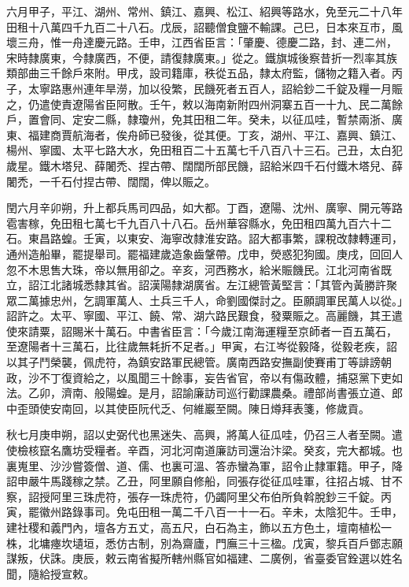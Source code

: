 \begin{pinyinscope}
 六月甲子，平江、湖州、常州、鎮江、嘉興、松江、紹興等路水，免至元二十八年田租十八萬四千九百二十八石。戊辰，詔聽僧食鹽不輸課。己巳，日本來互市，風壞三舟，惟一舟達慶元路。壬申，江西省臣言：「肇慶、德慶二路，封、連二州，宋時隸廣東，今隸廣西，不便，請復隸廣東。」從之。鐵旗城後察昔折一烈率其族類部曲三千餘戶來附。甲戌，設司籍庫，秩從五品，隸太府監，儲物之籍入者。丙子，太寧路惠州連年旱澇，加以役繁，民饑死者五百人，詔給鈔二千錠及糧一月賑之，仍遣使責遼陽省臣阿散。壬午，敕以海南新附四州洞寨五百一十九、民二萬餘戶，置會同、定安二縣，隸瓊州，免其田租二年。癸未，以征瓜哇，暫禁兩浙、廣東、福建商賈航海者，俟舟師已發後，從其便。丁亥，湖州、平江、嘉興、鎮江、楊州、寧國、太平七路大水，免田租百二十五萬七千八百八十三石。己丑，太白犯歲星。鐵木塔兒、薛闍禿、捏古帶、闊闊所部民饑，詔給米四千石付鐵木塔兒、薛闍禿，一千石付捏古帶、闊闊，俾以賑之。



 閏六月辛卯朔，升上都兵馬司四品，如大都。丁酉，遼陽、沈州、廣寧、開元等路雹害稼，免田租七萬七千九百八十八石。岳州華容縣水，免田租四萬九百六十二石。東昌路蝗。壬寅，以東安、海寧改隸淮安路。詔大都事繁，課稅改隸轉運司，通州造船畢，罷提舉司。罷福建歲造象齒鞶帶。戊申，熒惑犯狗國。庚戌，回回人忽不木思售大珠，帝以無用卻之。辛亥，河西務水，給米賑饑民。江北河南省既立，詔江北諸城悉隸其省。詔漢陽隸湖廣省。左江總管黃堅言：「其管內黃勝許聚眾二萬據忠州，乞調軍萬人、土兵三千人，命劉國傑討之。臣願調軍民萬人以從。」詔許之。太平、寧國、平江、饒、常、湖六路民艱食，發粟賑之。高麗饑，其王遣使來請粟，詔賜米十萬石。中書省臣言：「今歲江南海運糧至京師者一百五萬石，至遼陽者十三萬石，比往歲無耗折不足者。」甲寅，右江岑從毅降，從毅老疾，詔以其子鬥榮襲，佩虎符，為鎮安路軍民總管。廣南西路安撫副使賽甫丁等誹謗朝政，沙不丁復資給之，以風聞三十餘事，妄告省官，帝以有傷政體，捕惡黨下吏如法。乙卯，濟南、般陽蝗。是月，詔諭廉訪司巡行勸課農桑。禮部尚書張立道、郎中歪頭使安南回，以其使臣阮代乏、何維巖至闕。陳日燇拜表箋，修歲貢。



 秋七月庚申朔，詔以史弼代也黑迷失、高興，將萬人征瓜哇，仍召三人者至闕。遣使檢核竄名鷹坊受糧者。辛酉，河北河南道廉訪司還治汴梁。癸亥，完大都城。也裏嵬里、沙沙嘗簽僧、道、儒、也裏可溫、答赤蠻為軍，詔令止隸軍籍。甲子，降詔申嚴牛馬踐稼之禁。乙丑，阿里願自修船，同張存從征瓜哇軍，往招占城、甘不察，詔授阿里三珠虎符，張存一珠虎符，仍蠲阿里父布伯所負斡脫鈔三千錠。丙寅，罷徽州路錄事司。免屯田租一萬二千八百一十一石。辛未，太陰犯牛。壬申，建社稷和義門內，壇各方五丈，高五尺，白石為主，飾以五方色土，壇南植松一株，北墉瘞坎壝垣，悉仿古制，別為齋廬，門廡三十三楹。戊寅，黎兵百戶鄧志願謀叛，伏誅。庚辰，敕云南省擬所轄州縣官如福建、二廣例，省臺委官銓選以姓名聞，隨給授宣敕。




\end{pinyinscope}
